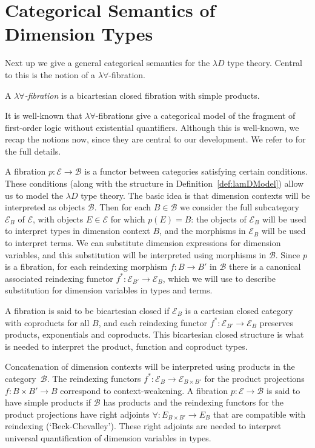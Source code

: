 \documentclass[a4paper,UKenglish]{lipics}
\newcommand{\B}{\mathcal{B}}
\newcommand{\E}{\mathcal{E}}
\begin{document}
\section{Categorical Semantics of Dimension Types} \label{sec:sem}
Next up we give a general categorical semantics for the $\lambda D$ type theory. Central to this is the notion of a $\lambda \forall$-fibration.

\begin{definition}
A \emph{$\lambda\forall$-fibration} is a bicartesian closed fibration with simple products.
\end{definition}

It is well-known that $\lambda \forall$-fibrations give a categorical model of the fragment of first-order logic without existential quantifiers. 
Although this is well-known, we recap the notions now,
since they are central to our development. We refer to \cite{jacobs1999categorical} for the full details.

A fibration $p:\E\to\B$ is a functor between categories satisfying certain conditions. These conditions (along with the structure in Definition~\ref{def:lamDModel}) allow us to model the $\lambda D$ type theory. The basic idea is that dimension contexts will be interpreted as objects $\B$. Then for each $B\in\B$ we consider the full subcategory $\E_B$ of $\E$, with objects $E\in\E$ for which $p(E)=B$: the objects of $\E_B$ will be used to interpret types in dimension context $B$, and the morphisms in $\E_B$ will be used to interpret terms. We can substitute dimension expressions for dimension variables, and this substitution will be interpreted using morphisms in $\B$. Since $p$ is a fibration, for each reindexing morphism $f:B\to B'$ in $\B$ there is a canonical associated reindexing functor $f^*:\E_{B'}\to \E_B$, which we will use to describe substitution for dimension variables in types and terms.

A fibration is said to be bicartesian closed if $\E_B$ is a cartesian closed category with coproducts for all $B$, and each reindexing functor $f^*:\E_{B'}\to\E_B$ preserves products, exponentials and coproducts. This bicartesian closed structure is what is needed to interpret the product, function and coproduct types.

Concatenation of dimension contexts will be interpreted using products in the category~$\B$. The reindexing functors  $f^*:\E_{B}\to \E_{B\times B'}$ for the product projections $f:B\times B'\to B$ correspond to context-weakening. A fibration $p:\E\to \B$ is said to have simple products if $\B$ has products and the reindexing functors for the product projections have right adjoints $\forall:E_{B\times B'}\to E_B$ that are compatible with reindexing (`Beck-Chevalley'). These right adjoints are needed to interpret universal quantification of dimension variables in types.
\end{document}
